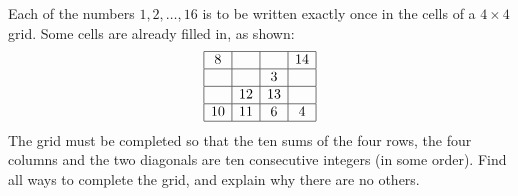 Each of the numbers $1,2,\dots,16$ is to be written exactly once in the cells of a $4\times4$ grid. Some cells are already filled in, as shown:
\[
\begin{array}{|c|c|c|c|}
\hline 8 & & & 14\\
\hline & & 3 & \\
\hline & 12 & 13 & \\
\hline 10 & 11 & 6 & 4\\
\hline
\end{array}
\]
The grid must be completed so that the ten sums of the four rows, the four columns and the two diagonals are ten consecutive integers (in some order). Find all ways to complete the grid, and explain why there are no others.
